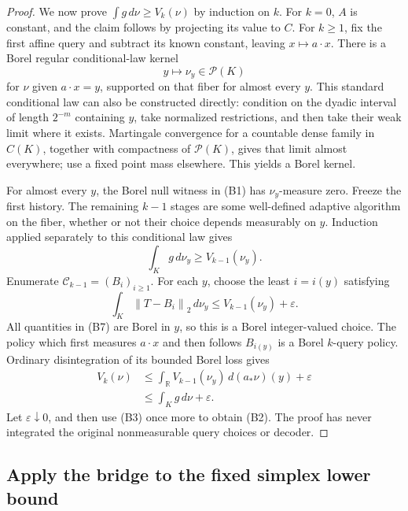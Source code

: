 \documentclass[11pt,a4paper]{article}
\newcommand{\R}{\mathbb R}
\newcommand{\norm}[1]{\left\lVert#1\right\rVert}
\theoremstyle{definition}
\theoremstyle{remark}
\numberwithin{equation}{section}
\begin{document}
\begin{proof}
We now prove \(\int g\,d\nu\ge V_k(\nu)\) by induction on \(k\).
For \(k=0\), \(A\) is constant, and the claim follows by projecting
its value to \(C\). For \(k\ge1\), fix the first affine query and
subtract its known constant, leaving \(x\mapsto a\cdot x\).
There is a Borel regular conditional-law kernel
\[
                  y\longmapsto\nu_y\in\mathcal P(K)
 \tag{B5}
\]
for \(\nu\) given \(a\cdot x=y\), supported on that fiber for almost
every \(y\). This standard conditional law can also be constructed
directly: condition on the dyadic interval of length \(2^{-m}\)
containing \(y\), take normalized restrictions, and then take their
weak limit where it exists. Martingale convergence for a countable
dense family in \(C(K)\), together with compactness of
\(\mathcal P(K)\), gives that limit almost everywhere; use a fixed
point mass elsewhere. This yields a Borel kernel.

For almost every \(y\), the Borel null witness in (B1) has
\(\nu_y\)-measure zero. Freeze the first history. The remaining
\(k-1\) stages are some well-defined adaptive algorithm on the fiber,
whether or not their choice depends measurably on \(y\). Induction
applied separately to this conditional law gives
\[
                        \int_K g\,d\nu_y\ge V_{k-1}(\nu_y).
 \tag{B6}
\]
Enumerate \(\mathcal C_{k-1}=(B_i)_{i\ge1}\). For each \(y\), choose
the least \(i=i(y)\) satisfying
\[
       \int_K\norm{T-B_i}_2\,d\nu_y
                          \le V_{k-1}(\nu_y)+\varepsilon .
 \tag{B7}
\]
All quantities in (B7) are Borel in \(y\), so this is a Borel
integer-valued choice. The policy which first measures \(a\cdot x\)
and then follows \(B_{i(y)}\) is a Borel \(k\)-query policy. Ordinary
disintegration of its bounded Borel loss gives
\[
\begin{split}
 V_k(\nu)
 &\le \int_\R V_{k-1}(\nu_y)\,d(a_*\nu)(y)+\varepsilon\\
 &\le \int_K g\,d\nu+\varepsilon .
\end{split}
 \tag{B8}
\]
Let \(\varepsilon\downarrow0\), and then use (B3) once more to obtain
(B2). The proof has never integrated the original nonmeasurable
query choices or decoder.
\end{proof}

\subsection{Apply the bridge to the fixed simplex lower bound}
\end{document}
